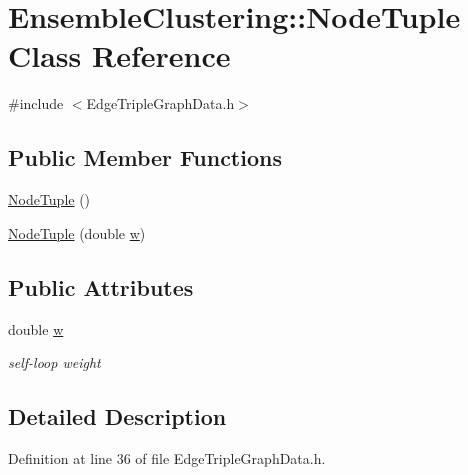 \hypertarget{class_ensemble_clustering_1_1_node_tuple}{\section{Ensemble\-Clustering\-:\-:Node\-Tuple Class Reference}
\label{class_ensemble_clustering_1_1_node_tuple}
}


{\ttfamily \#include $<$Edge\-Triple\-Graph\-Data.\-h$>$}

\subsection*{Public Member Functions}
\begin{DoxyCompactItemize}
\item 
\hyperlink{class_ensemble_clustering_1_1_node_tuple_a13bad67e06f1a1ec63c595b677afe597}{Node\-Tuple} ()
\item 
\hyperlink{class_ensemble_clustering_1_1_node_tuple_a76e905b5c712fc25f8b7b27f72f7c897}{Node\-Tuple} (double \hyperlink{class_ensemble_clustering_1_1_node_tuple_ad22f4e0e736249fe884f9adb87491d66}{w})
\end{DoxyCompactItemize}
\subsection*{Public Attributes}
\begin{DoxyCompactItemize}
\item 
double \hyperlink{class_ensemble_clustering_1_1_node_tuple_ad22f4e0e736249fe884f9adb87491d66}{w}
\begin{DoxyCompactList}\small\item\em self-\/loop weight \end{DoxyCompactList}\end{DoxyCompactItemize}


\subsection{Detailed Description}


Definition at line 36 of file Edge\-Triple\-Graph\-Data.\-h.



